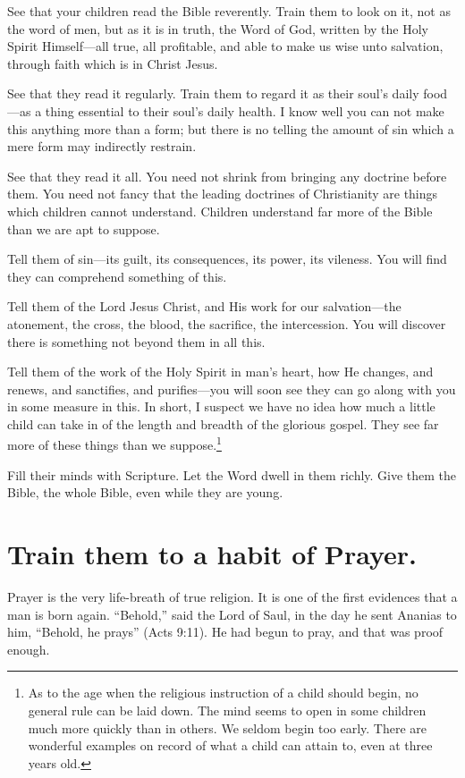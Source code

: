 \documentclass[
]{book}
\begin{document}
See that your children read the Bible reverently. Train them to look on it, not as the word of men, but as it is in truth, the Word of God, written by the Holy Spirit Himself---all true, all profitable, and able to make us wise unto salvation, through faith which is in Christ Jesus.

See that they read it regularly. Train them to regard it as their soul's daily food---as a thing essential to their soul's daily health. I know well you can not make this anything more than a form; but there is no telling the amount of sin which a mere form may indirectly restrain.

See that they read it all. You need not shrink from bringing any doctrine before them. You need not fancy that the leading doctrines of Christianity are things which children cannot understand. Children understand far more of the Bible than we are apt to suppose.

Tell them of sin---its guilt, its consequences, its power, its vileness. You will find they can comprehend something of this.

Tell them of the Lord Jesus Christ, and His work for our salvation---the atonement, the cross, the blood, the sacrifice, the intercession. You will discover there is something not beyond them in all this.

Tell them of the work of the Holy Spirit in man's heart, how He changes, and renews, and sanctifies, and purifies---you will soon see they can go along with you in some measure in this. In short, I suspect we have no idea how much a little child can take in of the length and breadth of the glorious gospel. They see far more of these things than we suppose.\footnote{As to the age when the religious instruction of a child should begin, no general rule can be laid down. The mind seems to open in some children much more quickly than in others. We seldom begin too early. There are wonderful examples on record of what a child can attain to, even at three years old.}

Fill their minds with Scripture. Let the Word dwell in them richly. Give them the Bible, the whole Bible, even while they are young.

\hypertarget{train-them-to-a-habit-of-prayer.}{%
\chapter{Train them to a habit of Prayer.}\label{train-them-to-a-habit-of-prayer.}}

Prayer is the very life-breath of true religion. It is one of the first evidences that a man is born again. ``Behold,'' said the Lord of Saul, in the day he sent Ananias to him, ``Behold, he prays'' (Acts 9:11). He had begun to pray, and that was proof enough.
\end{document}
